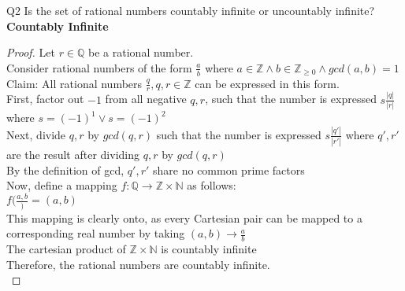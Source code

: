 \begin{problem}
    {Q2}
    Is the set of rational numbers countably infinite or uncountably infinite? \\
    \textbf{Countably Infinite} \\
    \begin{proof}
        Let $r \in \mathbb{Q}$ be a rational number. \\
        Consider rational numbers of the form $\frac{a}{b}$ where $a \in \mathbb{Z} \land b \in \mathbb{Z}_{\geq 0} \land gcd(a,b) = 1$ \\
        Claim: All rational numbers $\frac{q}{r}, q, r \in \mathbb{Z}$ can be expressed in this form. \\
        First, factor out $-1$ from all negative $q, r$, such that the number is expressed $s\frac{|q|}{|r|}$ where $s = (-1)^1 \lor s = (-1)^2$ \\
        Next, divide $q, r$ by $gcd(q, r)$ such that the number is expressed $s \frac{|q'|}{|r'|}$ where $q', r'$ are the result after dividing $q, r$ by $gcd(q, r)$ \\
        By the definition of gcd, $q', r'$ share no common prime factors \\
        Now, define a mapping $f: \mathbb{Q} \rightarrow \mathbb{Z} \times \mathbb{N}$ as follows: \\
        $f(\frac{a, b}) = (a, b)$ \\
        This mapping is clearly onto, as every Cartesian pair can be mapped to a corresponding real number by taking $(a,b) \rightarrow \frac{a}{b}$ \\
        The cartesian product of $\mathbb{Z} \times \mathbb{N}$ is countably infinite \\
        Therefore, the rational numbers are countably infinite. \\
    \end{proof}
\end{problem}
